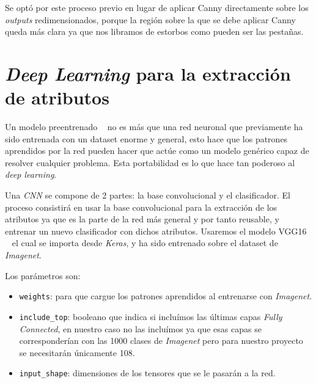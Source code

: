 

Se optó por este proceso previo en lugar de aplicar Canny directamente sobre los \emph{outputs} redimensionados, porque la región sobre la que se debe aplicar Canny queda más clara ya que nos libramos de estorbos como pueden ser las pestañas.

\section{\emph{Deep Learning} para la extracción de atributos}

Un modelo preentrenado ~\cite{chollet:2017} no es más que una red neuronal que previamente ha sido entrenada con un dataset enorme y general, esto hace que los patrones aprendidos por la red pueden hacer que actúe como un modelo genérico capaz de resolver cualquier problema.
Esta portabilidad es lo que hace tan poderoso al \emph{deep learning}.

Una \emph{CNN} se compone de 2 partes: la base convolucional y el clasificador. El proceso consistirá en usar la base convolucional para la extracción de los atributos ya que es la parte de la red más general y por tanto reusable, y entrenar un nuevo clasificador con dichos atributos.
Usaremos el modelo VGG16 ~\cite{simonyan:2014} el cual se importa desde \emph{Keras}, y ha sido entrenado sobre el dataset de \emph{Imagenet}.


Los parámetros son:
\begin{itemize}
    \item \texttt{weights}: para que cargue los patrones aprendidos al entrenarse con \emph{Imagenet}.
    \item\texttt{include\_top}: booleano que indica si incluímos las últimas capas \emph{Fully Connected}, en nuestro caso no las incluímos ya que esas capas se corresponderían con las 1000 clases de \emph{Imagenet} pero para nuestro proyecto se necesitarán únicamente 108.
    \item\texttt{input\_shape}: dimensiones de los tensores que se le pasarán a la red.
\end{itemize}

